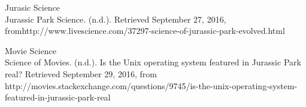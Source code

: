 \documentclass[12ptletterpaper]{paper}
\begin{document}
\begin{flushleft}
		\noindent\hypertarget{Jurasic Science}{Jurasic Science\\Jurassic Park Science. (n.d.). Retrieved September 27, 2016, fromhttp://www.livescience.com/37297-science-of-jurassic-park-evolved.html} \vspace{12pt}
		
		\noindent\hypertarget{Movie Science}{Movie Science\\Science of Movies. (n.d.). Is the Unix operating system featured in Jurassic Park real? Retrieved September 29, 2016, from http://movies.stackexchange.com/questions/9745/is-the-unix-operating-system-featured-in-jurassic-park-real} \vspace{12pt}		
		
		
	\end{flushleft}
\end{document}

